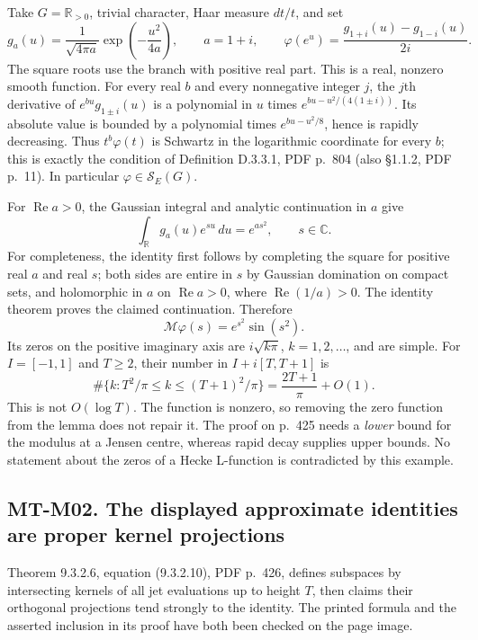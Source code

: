Take $G=\mathbb R_{>0}$, trivial character, Haar measure $dt/t$, and set
\[
 g_a(u)=\frac{1}{\sqrt{4\pi a}}\exp\left(-\frac{u^2}{4a}\right),
 \qquad a=1+i,\qquad
 \varphi(e^u)=\frac{g_{1+i}(u)-g_{1-i}(u)}{2i}.
\]
The square roots use the branch with positive real part.  This is a real,
nonzero smooth function.  For every real $b$ and every nonnegative integer
$j$, the $j$th derivative of $e^{bu}g_{1\pm i}(u)$ is a polynomial in $u$
times $e^{bu-u^2/(4(1\pm i))}$.  Its absolute value is bounded by a
polynomial times $e^{bu-u^2/8}$, hence is rapidly decreasing.  Thus
$t^b\varphi(t)$ is Schwartz in the logarithmic coordinate for every $b$;
this is exactly the condition of Definition D.3.3.1, PDF p.~804 (also
\S1.1.2, PDF p.~11).  In particular $\varphi\in\mathcal S_E(G)$.

For $\operatorname{Re}a>0$, the Gaussian integral and analytic continuation
in $a$ give
\[
 \int_{\mathbb R}g_a(u)e^{su}\,du=e^{as^2},\qquad s\in\mathbb C.
\]
For completeness, the identity first follows by completing the square for
positive real $a$ and real $s$; both sides are entire in $s$ by Gaussian
domination on compact sets, and holomorphic in $a$ on
$\operatorname{Re}a>0$, where $\operatorname{Re}(1/a)>0$.  The identity
theorem proves the claimed continuation.  Therefore
\[
 \mathcal M\varphi(s)=e^{s^2}\sin(s^2).
\]
Its zeros on the positive imaginary axis are
$i\sqrt{k\pi}$, $k=1,2,\ldots$, and are simple.  For $I=[-1,1]$ and
$T\ge2$, their number in $I+i[T,T+1]$ is
\[
 \#\{k:T^2/\pi\le k\le(T+1)^2/\pi\}
   =\frac{2T+1}{\pi}+O(1).
\]
This is not $O(\log T)$.  The function is nonzero, so removing the zero
function from the lemma does not repair it.  The proof on p.~425 needs a
\emph{lower} bound for the modulus at a Jensen centre, whereas rapid decay
supplies upper bounds.  No statement about the zeros of a Hecke L-function
is contradicted by this example.

\subsection*{MT-M02. The displayed approximate identities are proper kernel projections}
Theorem 9.3.2.6, equation (9.3.2.10), PDF p.~426, defines subspaces by
intersecting kernels of all jet evaluations up to height $T$, then claims
their orthogonal projections tend strongly to the identity.  The printed
formula and the asserted inclusion in its proof have both been checked on
the page image.

